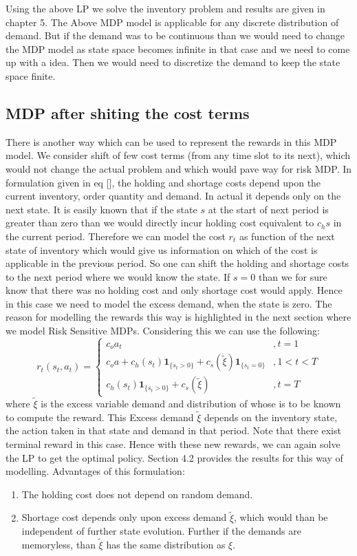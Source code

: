 \documentclass[11pt,a4paper,oneside]{report}
\begin{document}
Using the above LP we solve the inventory problem and results are given in chapter 5. The Above MDP model is  applicable for any discrete distribution of demand. But if the demand was to be continuous than we would need to change the MDP model as state space becomes infinite in that case and we need to come up with a idea. Then we would need to discretize the demand to keep the state space finite. 
\subsection{MDP after shiting the cost terms}
There is another way which can be used to represent the rewards in this MDP model. We consider  shift of few cost terms (from any time slot to its next), which would not change the actual problem and which would pave way for risk MDP. In formulation given in eq [], the holding and shortage costs depend upon the current inventory, order quantity and demand. In actual it depends only on the next state. It is easily known that if the state $s$ at the start of next period is greater than zero than we would directly incur holding cost equivalent to $c_hs$ in the current period. Therefore we can model the cost $r_t$ as function of the next state of inventory which would give us information on which of the cost is applicable in the previous period. So one can shift the holding and shortage costs to the next period where we would know the state. If $s=0$ than we for sure know that there was no holding cost and only shortage cost would apply.
Hence in this case we need to model the excess demand, when the state is zero. The reason for modelling the rewards this way is highlighted in the next section where we model Risk Sensitive MDPs. Considering this we can use the following:\\
\begin{equation*}
r_t(s_t,a_t)=
\begin{cases}
c_{o}a_t&,t=1\\
c_{o}a + c_h(s_t)\mathbf{1}_{\lbrace s_t>0\rbrace} + c_s(\tilde{\xi})\mathbf{1}_{\lbrace s_t=0\rbrace}&,1<t< T\\
c_h(s_t)\mathbf{1}_{\lbrace s_t>0\rbrace} + c_s(\tilde{\xi})&,t=T
\end{cases}
\end{equation*}
\noindent where $\tilde{\xi}$ is the excess variable demand and distribution of whose is to be known to compute the reward. This Excess demand $\tilde{\xi}$ depends on the inventory state, the action taken in that state and demand in that period. Note that there exist terminal reward in this case. Hence with these new rewards, we can again solve the LP to get the optimal policy. Section 4.2 provides the results for this way of modelling. 
Advantages of this formulation:
\begin{enumerate}
\item The holding cost does not depend on random demand.
\item Shortage cost depends only upon excess demand $\tilde\xi$, which would than be independent of further state evolution. Further if the demands are memoryless, than $\tilde{\xi}$ has the same distribution as $\xi$.
\end{enumerate}
\end{document}
